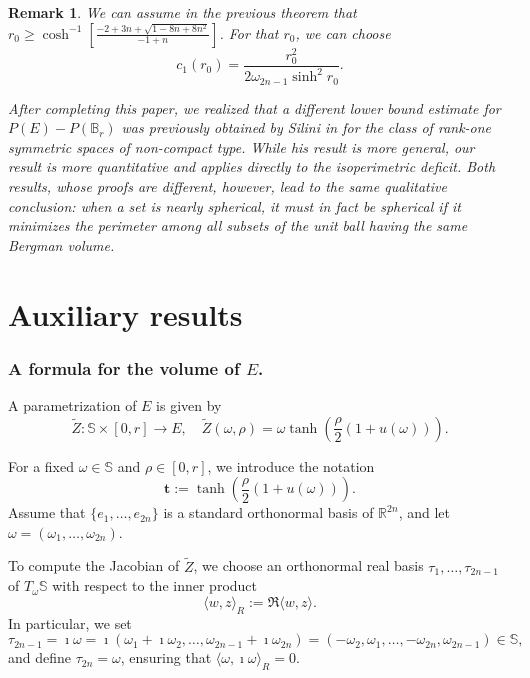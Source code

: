 \documentclass[11pt]{amsart}
\newtheorem{remark}[theorem]{Remark}
\numberwithin{equation}{section}
\def\ge{\geqslant}
\begin{document}
\begin{remark}
We can assume in the previous theorem that $r_0\ge \cosh^{-1}\left[\frac{-2+3 n+\sqrt{1-8 n+8 n^2}}{-1+n}\right]$. For that $r_0$, we can choose $$c_1(r_0)=\frac{r_0^2}{2\omega_{2n-1} \sinh^2r_0 }.$$

After completing this paper, we realized that a different lower bound estimate for 
\(P(E) - P(\mathbb{B}_r)\) was previously obtained by Silini in \cite{Silini2025} 
for the class of rank-one symmetric spaces of non-compact type. While his result is 
more general, our result is \emph{more quantitative} and applies directly to the 
\emph{isoperimetric deficit}. Both results, whose proofs are different, however, lead to the same qualitative 
conclusion: when a set is nearly spherical, it must in fact be spherical if it 
\emph{minimizes the perimeter} among all subsets of the unit ball having the same 
\emph{Bergman volume}.
\end{remark}
\section{Auxiliary results}\label{sect3}

\subsubsection{A formula for the volume of $E$.}\label{subsub} A parametrization of $E$ is given by
\[
\tilde{Z} : \mathbb{S} \times [0, r] \to E, \quad \tilde{Z}(\omega, \rho) = \omega \tanh\left(\frac{\rho}{2} (1 + u(\omega))\right).
\]

For a fixed \(\omega \in \mathbb{S}\) and \(\rho \in [0, r]\), we introduce the notation
\[
\mathbf{t} := \tanh\left(\frac{\rho}{2} (1 + u(\omega))\right).
\]
Assume that \(\{e_1, \dots, e_{2n}\}\) is a standard orthonormal basis of \(\mathbb{R}^{2n}\), and let \(\omega = (\omega_1, \dots, \omega_{2n})\).

To compute the Jacobian of \(\tilde{Z}\), we choose an orthonormal real basis \(\tau_1, \dots, \tau_{2n-1}\) of \(T_{\omega} \mathbb{S}\) with respect to the inner product
\[
\langle w, z \rangle_R := \Re \langle w, z \rangle.
\]
In particular, we set
\[
\tau_{2n-1} = \imath\omega = \imath (\omega_1 + \imath\omega_2, \dots, \omega_{2n-1} + \imath\omega_{2n}) = (-\omega_2, \omega_1, \dots, -\omega_{2n}, \omega_{2n-1}) \in \mathbb{S},
\]
and define \(\tau_{2n} = \omega\), ensuring that \(\langle \omega, \imath\omega \rangle_R = 0\).
\end{document}

